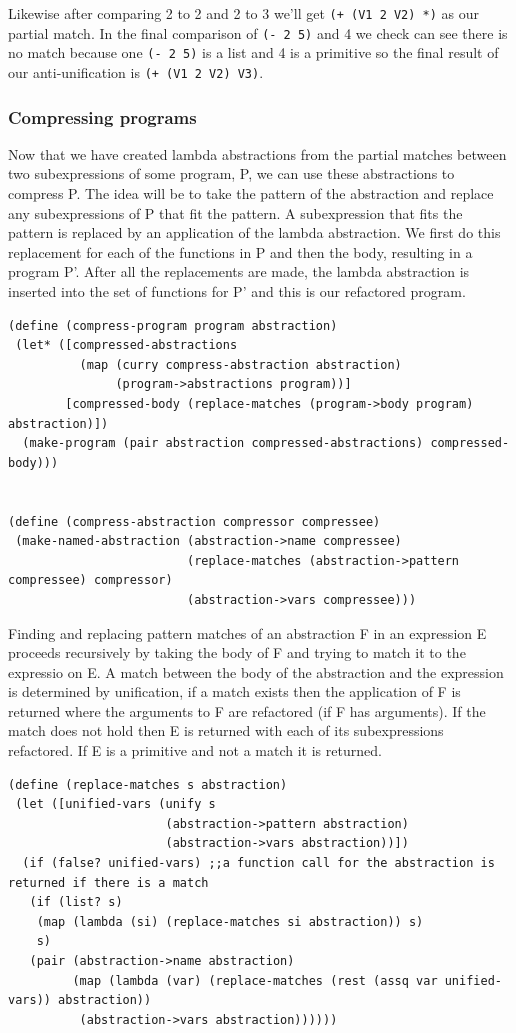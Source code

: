 \documentclass[a4paper,10pt]{article}
\begin{document}
Likewise after comparing 2 to 2 and 2 to 3 we'll get \texttt{(+ (V1 2 V2) *)} as our partial match.
In the final comparison of \texttt{(- 2 5)} and 4 we check can see there is no match because one \texttt{(- 2 5)} is a list and 4 is a primitive so the final result of our anti-unification is \texttt{(+ (V1 2 V2) V3)}.


\subsubsection{Compressing programs}
Now that we have created lambda abstractions from the partial matches between two subexpressions of some program, P, we can use these abstractions to compress P.  The idea will be to take the pattern of the abstraction and replace any subexpressions of P that fit the pattern.  A subexpression that fits the pattern is replaced by an application of the lambda abstraction.  We first do this replacement for each of the functions in P and then the body, resulting in a program P'.  After all the replacements are made, the lambda abstraction is inserted into the set of functions for P' and this is our refactored program.
\begin{verbatim}
(define (compress-program program abstraction)
 (let* ([compressed-abstractions 
          (map (curry compress-abstraction abstraction)
               (program->abstractions program))]
        [compressed-body (replace-matches (program->body program) abstraction)])
  (make-program (pair abstraction compressed-abstractions) compressed-body)))
                           

(define (compress-abstraction compressor compressee)
 (make-named-abstraction (abstraction->name compressee)
                         (replace-matches (abstraction->pattern compressee) compressor)
                         (abstraction->vars compressee)))
\end{verbatim}
Finding and replacing pattern matches of an abstraction F in an expression E proceeds recursively by taking the body of F and trying to match it to the expressio on E.  A match between the body of the abstraction and the expression is determined by unification, if a match exists then the application of F is returned where the arguments to F are refactored (if F has arguments).  If the match does not hold then E is returned with each of its subexpressions refactored.  If E is a primitive and not a match it is returned.

\begin{verbatim}
(define (replace-matches s abstraction)
 (let ([unified-vars (unify s
                      (abstraction->pattern abstraction)
                      (abstraction->vars abstraction))])
  (if (false? unified-vars) ;;a function call for the abstraction is returned if there is a match
   (if (list? s)
    (map (lambda (si) (replace-matches si abstraction)) s)
    s)
   (pair (abstraction->name abstraction)  
         (map (lambda (var) (replace-matches (rest (assq var unified-vars)) abstraction))
          (abstraction->vars abstraction))))))
\end{verbatim}
\end{document}
